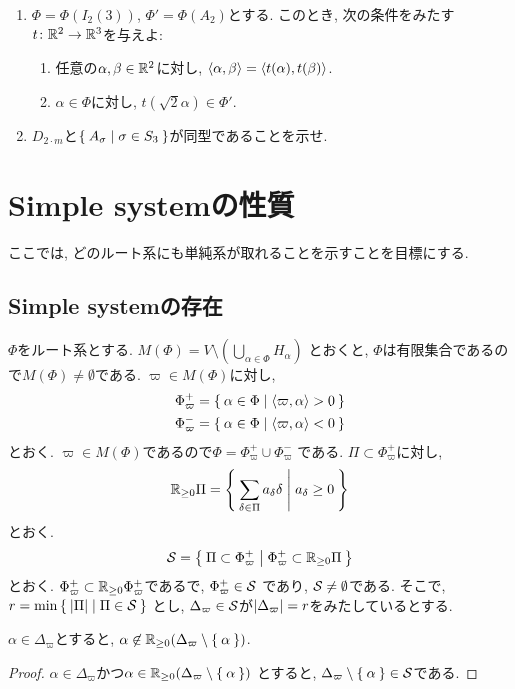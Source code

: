\begin{enumerate}
\item
  $\Phi=\Phi(I_2(3))$,
  $\Phi'=\Phi(A_2)$とする.
  このとき,
  次の条件をみたす$t\colon \mathbb{R}^2\to \mathbb{R}^3$を与えよ:
  \begin{enumerate}
    \item 任意の$\alpha,\beta\in \mathbb{R}^2$に対し, $\Braket{\alpha,\beta}=\Braket{t(\alpha),t(\beta)}$.
    \item $\alpha\in\Phi$に対し, $ t(\sqrt{2}\alpha)\in \Phi'$.
  \end{enumerate}
\item $D_{2\cdot m}$と$\Set{A_\sigma|\sigma\in S_3}$が同型であることを示せ.
\end{enumerate}

\chapter{Simple systemの性質}
ここでは, どのルート系にも単純系が取れることを示すことを目標にする.
\section{Simple systemの存在}
$\Phi$をルート系とする.
$M(\Phi)=V \setminus (\bigcup_{\alpha\in\Phi}H_\alpha)$
とおくと,
$\Phi$は有限集合であるので$M(\Phi)\neq \emptyset$である.
$\varpi\in M(\Phi)$に対し,
\begin{align*}
  \Phi_{\varpi}^+&=\Set{\alpha\in\Phi|\Braket{\varpi,\alpha}>0}\\
  \Phi_{\varpi}^-&=\Set{\alpha\in\Phi|\Braket{\varpi,\alpha}<0}
\end{align*}
とおく.
$\varpi\in M(\Phi)$であるので$\Phi=\Phi_{\varpi}^+\cup \Phi_{\varpi}^-$
である.
$\Pi\subset \Phi_{\varpi}^+$に対し,
\begin{align*}
  \mathbb{R}_{\geq 0}\Pi =
  \Set{\sum_{\delta\in\Pi}a_\delta \delta|a_\delta \geq 0}
\end{align*}
とおく.
\begin{align*}
  \mathcal{S} =
  \Set{\Pi\subset \Phi_{\varpi}^+|\Phi_{\varpi}^+\subset \mathbb{R}_{\geq 0}\Pi}
\end{align*}
とおく.
$\Phi_{\varpi}^+\subset \mathbb{R}_{\geq 0}\Phi_{\varpi}^+$であるで,
$\Phi_{\varpi}^+\in\mathcal{S}$
であり, $\mathcal{S}\neq\emptyset$である.
そこで, $r=\min\Set{\left|\Pi\right||\Pi\in\mathcal{S}}$
とし, $\Delta_{\varpi}\in\mathcal{S}$が$\left|\Delta_{\varpi}\right|=r$をみたしているとする.
\begin{lemma}
  \label{lem:simple:posiindp}
  $\alpha\in \Delta_{\varpi}$とすると,
  $\alpha\not\in\mathbb{R}_{\geq 0}(\Delta_{\varpi}\setminus\Set{\alpha})$.
\end{lemma}
\begin{proof}
  $\alpha\in \Delta_{\varpi}$かつ$\alpha\in\mathbb{R}_{\geq 0}(\Delta_{\varpi}\setminus\Set{\alpha})$
  とすると, $\Delta_{\varpi}\setminus\Set{\alpha}\in\mathcal{S}$である.
\end{proof}

